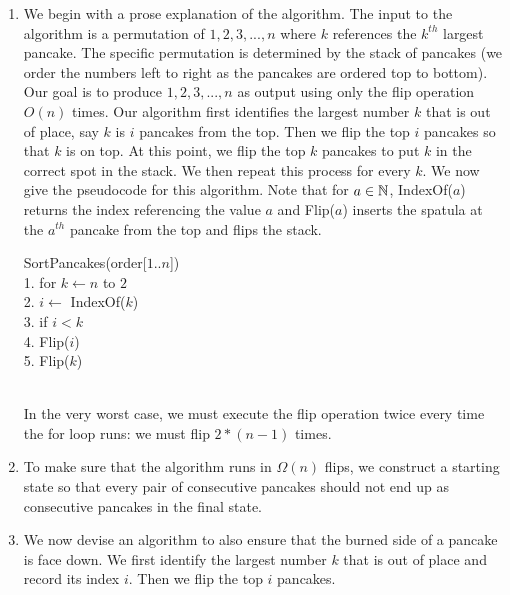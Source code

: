\documentclass{article}
\begin{document}
\begin{enumerate}[label=\alph*.]
    \item We begin with a prose explanation of the algorithm.
    The input to the algorithm is a permutation of $1,2,3, ... , n$ where $k$ references the $k^{th}$ largest pancake.
    The specific permutation is determined by the stack of pancakes (we order the numbers left to right as the pancakes are ordered top to bottom).
    Our goal is to produce $1,2,3,..., n$ as output using only the flip operation $O(n)$ times. \parspace
    Our algorithm first identifies the largest number $k$ that is out of place, say $k$ is $i$ pancakes from the top.
    Then we flip the top $i$ pancakes so that $k$ is on top.
    At this point, we flip the top $k$ pancakes to put $k$ in the correct spot in the stack.
    We then repeat this process for every $k$. \parspace
    We now give the pseudocode for this algorithm.
    Note that for $a \in {\mathbb N}$, IndexOf($a$) returns the index referencing the value $a$ and Flip($a$) inserts the spatula at the $a^{th}$ pancake from the top and flips the stack.
    \begin{algorithm}
        SortPancakes(order[$1..n$])                         \\
        1. for $k \leftarrow n$ to $2$                      \\
        2. \hspace{2em} $i \leftarrow $ IndexOf($k$)        \\
        3. \hspace{2em} if $i < k$                          \\
        4. \hspace{4em} Flip($i$)                           \\
        5. \hspace{4em} Flip($k$)
    \end{algorithm} \\
    In the very worst case, we must execute the flip operation twice every time the for loop runs: we must flip $2*(n-1)$ times.
    \item To make sure that the algorithm runs in $\Omega (n)$ flips, we construct a starting state so that every pair of consecutive pancakes should not end up as consecutive pancakes in the final state.
    \item We now devise an algorithm to also ensure that the burned side of a pancake is face down.
    We first identify the largest number $k$ that is out of place and record its index $i$.
    Then we flip the top $i$ pancakes.

\end{enumerate}
\end{document}
